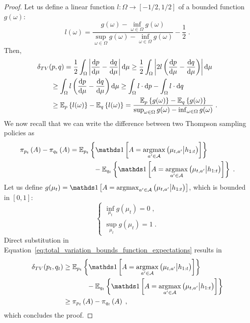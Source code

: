 \begin{proof}
	Let us define a linear function $l:\Omega \rightarrow [-1/2,1/2]$ of a bounded function $g(\omega)$:
	\begin{equation}
	l(\omega)=\frac{g(\omega)-\inf_{\omega \in \Omega} g(\omega)}{\sup_{\omega \in \Omega} g(\omega)-\inf_{\omega \in \Omega} g(\omega)} -\frac{1}{2} \; .
	\end{equation}
	Then,
	\begin{align}
	&\delta_{TV}(p, q) = \frac{1}{2} \int_{\Omega} \left|\frac{\mathrm{d} p}{\mathrm{d} \mu} - \frac{\mathrm{d} q}{\mathrm{d} \mu} \right| \mathrm{d} \mu \geq \frac{1}{2} \int_{\Omega} \left|2 l \left(\frac{\mathrm{d} p}{\mathrm{d} \mu} - \frac{\mathrm{d} q}{\mathrm{d} \mu} \right) \right| \mathrm{d} \mu \nonumber \\
		& \qquad  \geq \int_{\Omega} l \left(\frac{\mathrm{d} p}{\mathrm{d} \mu} - \frac{\mathrm{d} q}{\mathrm{d} \mu} \right) \mathrm{d} \mu \geq \int_{\Omega} l \cdot \mathrm{d} p - \int_{\Omega} l \cdot \mathrm{d} q \nonumber \\
		& \qquad \geq \mathbb{E}_{p}\left\{ l(\omega) \right\}-\mathbb{E}_{q}\left\{ l(\omega) \right\} = \frac{\mathbb{E}_{p}\left\{ g(\omega) \right\}-\mathbb{E}_{q}\left\{ g(\omega) \right\}}{\sup_{\omega \in \Omega} g(\omega)-\inf_{\omega \in \Omega} g(\omega)} \; .
	\label{eq:total_variation_bounds_function_expectations}
	\end{align}
	We now recall that we can write the difference between two Thompson sampling policies as
	\begin{align}
	\myPi{p_t}{A} - \myPi{q_t}{A} &= \eValue{p_t}{\myind{A=\argmax_{a^\prime \in \A} \left(\mu_{t,a^\prime} \big| h_{1:t}\right)}} \nonumber \\
		&\hspace*{0.1\columnwidth}- \eValue{q_t}{\myind{A=\argmax_{a^\prime \in \A} \left(\mu_{t,a^\prime} \big| h_{1:t}\right)}} \;.
	\end{align}
	Let us define $g(\mu_{t}) = \myind{A=\argmax_{a^\prime \in \A} \left(\mu_{t,a^\prime} \big| h_{1:t}\right)}$, which is bounded in $[0,1]$:
	\begin{equation}
	\begin{cases}
	\inf_{\mu_{t}} g(\mu_{t}) = 0 \;,\\
	\sup_{\mu_{t}} g(\mu_{t}) = 1 \;.
	\end{cases}
	\end{equation} 
	Direct substitution in Equation~\eqref{eq:total_variation_bounds_function_expectations} results in	
	\begin{align}
	\delta_{TV}(p_t,q_t) &\geq \eValue{p_t}{\myind{A=\argmax_{a^\prime \in \A} \left(\mu_{t,a^\prime} \big| h_{1:t}\right)}} \nonumber \\
	&\hspace*{0.1\columnwidth}- \eValue{q_t}{\myind{A=\argmax_{a^\prime \in \A} \left(\mu_{t,a^\prime} \big| h_{1:t}\right)}} \nonumber \\
	& \geq \myPi{p_t}{A} - \myPi{q_t}{A} \;,
	\end{align}
	which concludes the proof.
\end{proof}

